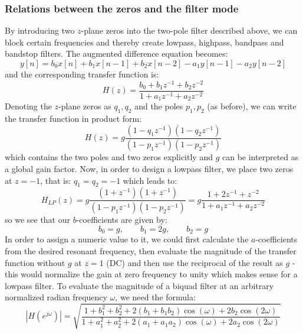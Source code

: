 \subsubsection{Relations between the zeros and the filter mode}
By introducing two $z$-plane zeros into the two-pole filter described above, we can block certain frequencies and thereby create lowpass, highpass, bandpass and bandstop filters. The augmented difference equation becomes:
\begin{equation}
 y[n] = b_0 x[n] + b_1 x[n-1] + b_2 x[n-2] - a_1 y[n-1] - a_2 y[n-2]
\end{equation}
and the corresponding transfer function is:
\begin{equation}
 H(z) = \frac{b_0 + b_1 z^{-1} + b_2 z^{-2}} {1 + a_1 z^{-1} + a_2 z^{-2}}
\end{equation}
Denoting the $z$-plane zeros as $q_1, q_2$ and the poles $p_1, p_2$ (as before), we can write the transfer function in product form:
\begin{equation}
 H(z) = g \frac{(1 - q_1 z^{-1})(1 - q_2 z^{-1})} {(1 - p_1 z^{-1})(1 - p_2 z^{-1}) }
\end{equation}
which contains the two poles and two zeros explicitly and $g$ can be interpreted as a global gain factor. Now, in order to design a lowpass filter, we place two zeros at $z=-1$, that is: $q_1 = q_2 = -1$ which leads to:
\begin{equation}
 H_{LP}(z) = g \frac{(1 + z^{-1})(1 + z^{-1})} {(1 - p_1 z^{-1})(1 - p_2 z^{-1}) }
           = g \frac{1 + 2 z^{-1} + z^{-2}}    {1 + a_1 z^{-1} + a_2 z^{-2}      }
\end{equation}
so we see that our $b$-coefficients are given by:
\begin{equation}
 b_0 = g, \qquad b_1 = 2 g, \qquad b_2 = g
\end{equation}
In order to assign a numeric value to it, we could first calculate the $a$-coefficients from the desired resonant frequency, then evaluate the magnitude of the transfer function without $g$ at $z=1$ (DC) and then use the reciprocal of the result as $g$ - this would normalize the gain at zero frequency to unity which makes sense for a lowpass filter. To evaluate the magnitude of a biquad filter at an arbitrary normalized radian frequency $\omega$, we need the formula:
\begin{equation}
 |H(e^{j \omega})| 
 = \sqrt{\frac{1 + b_1^2 + b_2^2 + 2 (b_1 + b_1 b_2) \cos (\omega) + 2 b_2 \cos(2 \omega) }
              {1 + a_1^2 + a_2^2 + 2 (a_1 + a_1 a_2) \cos (\omega) + 2 a_2 \cos(2 \omega) } }
\end{equation}
